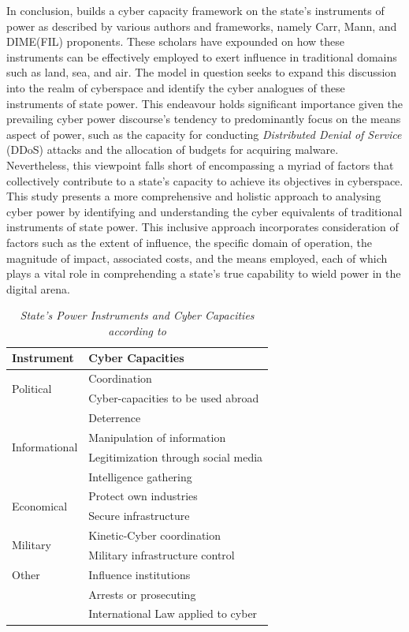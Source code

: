 In conclusion, \textcite{vanhaaster_2016_assessing} builds a cyber capacity framework on the state’s instruments of power as described by various authors and frameworks, namely Carr, Mann, and DIME(FIL) proponents.  These scholars have expounded on how these instruments can be effectively employed to exert influence in traditional domains such as land, sea, and air. The model in question seeks to expand this discussion into the realm of cyberspace and identify the cyber analogues of these instruments of state power. This endeavour holds significant importance given the prevailing cyber power discourse's tendency to predominantly focus on the means aspect of power, such as the capacity for conducting \textit{Distributed Denial of Service} (DDoS) attacks and the allocation of budgets for acquiring malware. Nevertheless, this viewpoint falls short of encompassing a myriad of factors that collectively contribute to a state's capacity to achieve its objectives in cyberspace. This study presents a more comprehensive and holistic approach to analysing cyber power by identifying and understanding the cyber equivalents of traditional instruments of state power. This inclusive approach incorporates consideration of factors such as the extent of influence, the specific domain of operation, the magnitude of impact, associated costs, and the means employed, each of which plays a vital role in comprehending a state's true capability to wield power in the digital arena. 

\begin{table}[htbp]
  \centering
  \caption{\emph{State's Power Instruments and Cyber Capacities according to \textcite{vanhaaster_2016_assessing}}}
  \begin{tabularx}{\textwidth}{p{2.5cm}X}
    \toprule
    \textbf{Instrument} & \textbf{Cyber Capacities} \\
    \midrule
    \multirow{2}{*}{Political} & Coordination \\
    & Cyber-capacities to be used abroad \\
    & Deterrence \\
    \midrule
    \multirow{2}{*}{Informational} & Manipulation of information \\
    & Legitimization through social media \\
    & Intelligence gathering \\
    \midrule
    \multirow{2}{*}{Economical} & Protect own industries \\
    & Secure infrastructure \\
    \midrule
    \multirow{2}{*}{Military} & Kinetic-Cyber coordination \\
    & Military infrastructure control \\
    \midrule
    Other & Influence institutions \\
    & Arrests or prosecuting \\
    & International Law applied to cyber \\
    \bottomrule
  \end{tabularx}
  \label{tab:state-power-cyber}
\end{table}


